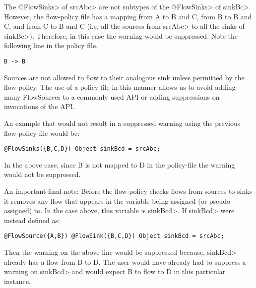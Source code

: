 The \<@FlowSinks> of \<srcAbc> are not subtypes of the
\<@FlowSinks> of \<sinkBc>.  However, the flow-policy file has a
mapping from A to B and C, from B to B and C, and from C to B
and C (i.e. all the sources from \<srcAbc> to all the sinks of
\<sinkBc>).   Therefore, in this case the warning would be
suppressed.  Note the following line in the policy file.
\begin{Verbatim}
B -> B
\end{Verbatim}

Sources are not allowed to flow to their analogous sink unless
permitted by the flow-policy.  The use of a policy file in
this manner allows us to avoid adding many FlowSources to a
commonly used API or adding suppressions on invocations of
the API.

An example that would not result in a suppressed warning
using the previous flow-policy file would be:

\begin{Verbatim}
@FlowSinks({B,C,D}) Object sinkBcd = srcAbc;
\end{Verbatim}

In the above case, since B is not mapped to D in the
policy-file the warning would not be suppressed.

An important final note:
Before the flow-policy checks flows from sources to sinks
it removes any flow that appears in the variable being assigned
(or pseudo assigned) to.  In the case above, this variable is
\<sinkBcd>.  If \<sinkBcd> were instead defined as:
\begin{Verbatim}
@FlowSource({A,B}) @FlowSink({B,C,D}) Object sinkBcd = srcAbc;
\end{Verbatim}
Then the warning on the above line would be suppressed because,
\<sinkBcd> already has a flow from B to D.  The user would have
already had to suppress a warning on \<sinkBcd> and would expect
B to flow to D in this particular instance.




